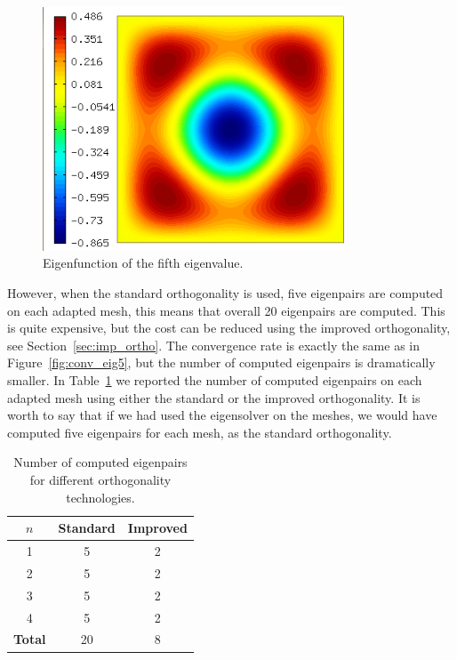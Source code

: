 \documentclass[preprint,12pt]{elsarticle}
\begin{document}
\begin{figure}[!ht]
\begin{center}
\includegraphics[width=0.8\textwidth]{img/ex_2_paper.png}
\end{center}
\vspace{-5mm}
\caption{Eigenfunction of the fifth eigenvalue.}
\label{fig:sol_eig5}
\end{figure}

However, when the standard orthogonality is used, five eigenpairs are computed on each adapted mesh, this means that overall 20 eigenpairs are computed. This is quite expensive, but the cost can be reduced using the improved orthogonality, see Section~\ref{sec:imp_ortho}. The convergence rate is exactly the same as in Figure~\ref{fig:conv_eig5}, but the number of computed eigenpairs is dramatically smaller. In Table~\ref{tab:imp_orhto} we reported the number of computed eigenpairs on each adapted mesh using either the standard or the improved orthogonality.
It is worth to say that if we had used the eigensolver on the meshes, we would have computed five eigenpairs for each mesh, as the standard orthogonality.

\begin{table}[h]
\begin{center}

\begin{tabular}{|c|c|c|}
\hline
$n$ &  Standard &Improved\\
\hline
\hline
1 & 5 & 2\\
\hline
2 & 5 & 2\\
\hline
3 & 5 & 2\\
\hline
4 & 5 & 2\\
\hline \hline
\bf{Total} & 20 & 8\\
\hline
\end{tabular}
\end{center}

\caption{Number of computed eigenpairs for different orthogonality technologies.}\label{tab:imp_orhto}
\end{table}
\end{document}
